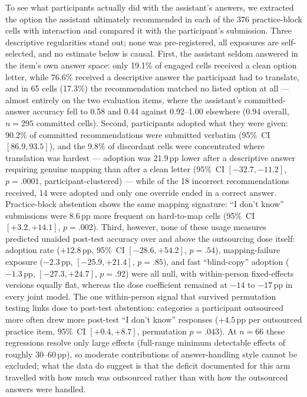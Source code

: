 
To see what participants actually did with the assistant's answers, we extracted the
option the assistant ultimately recommended in each of the 376 practice-block cells
with interaction and compared it with the participant's submission. Three descriptive
regularities stand out; none was pre-registered, all exposures are self-selected, and
no estimate below is causal. First, the assistant seldom answered in the item's own
answer space: only 19.1\% of engaged cells received a clean option letter, while
76.6\% received a descriptive answer the participant had to translate, and in 65
cells (17.3\%) the recommendation matched no listed option at all --- almost entirely
on the two evaluation items, where the assistant's committed-answer accuracy fell to
0.58 and 0.44 against 0.92--1.00 elsewhere (0.94 overall, $n=295$ committed cells).
Second, participants adopted what they were given: 90.2\% of committed
recommendations were submitted verbatim (95\%~CI $[86.9, 93.5]$), and the 9.8\% of
discordant cells were concentrated where translation was hardest --- adoption was
21.9\,pp lower after a descriptive answer requiring genuine mapping than after a
clean letter (95\%~CI $[-32.7, -11.2]$, $p=.0001$, participant-clustered) --- while
of the 18 incorrect recommendations received, 14 were adopted and only one override
ended in a correct answer. Practice-block abstention shows the same mapping
signature: ``I don't know'' submissions were 8.6\,pp more frequent on
hard-to-map cells (95\%~CI $[+3.2, +14.1]$, $p=.002$). Third, however, none of these
usage measures predicted unaided post-test accuracy over and above the outsourcing
dose itself: adoption rate ($+12.8$\,pp, 95\%~CI $[-28.6, +54.2]$, $p=.54$),
mapping-failure exposure ($-2.3$\,pp, $[-25.9, +21.4]$, $p=.85$), and fast
``blind-copy'' adoption ($-1.3$\,pp, $[-27.3, +24.7]$, $p=.92$) were all null, with
within-person fixed-effects versions equally flat, whereas the dose coefficient
remained at $-14$ to $-17$\,pp in every joint model. The one within-person signal
that survived permutation testing links dose to post-test abstention: categories a
participant outsourced more often drew more post-test ``I don't know'' responses
($+4.5$\,pp per outsourced practice item, 95\%~CI $[+0.4, +8.7]$, permutation
$p=.043$). At $n=66$ these regressions resolve only large effects (full-range
minimum detectable effects of roughly 30--60\,pp), so moderate contributions of
answer-handling style cannot be excluded; what the data do suggest is that the
deficit documented for this arm travelled with how much was outsourced rather than
with how the outsourced answers were handled.
